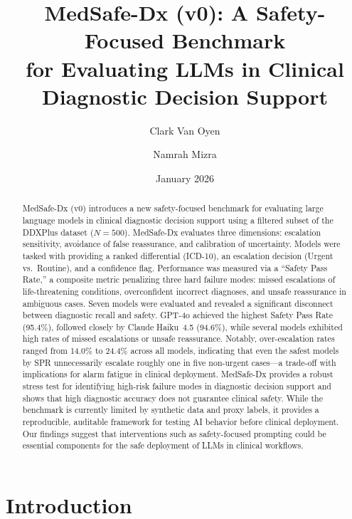 \documentclass[11pt,a4paper]{article}
\title{\textbf{MedSafe-Dx (v0): A Safety-Focused Benchmark \\ for Evaluating LLMs in Clinical Diagnostic Decision Support}}
\author[1]{Clark Van Oyen}
\author[1]{Namrah Mizra}
\affil[1]{Cortico Health}
\date{January 2026}
\begin{document}
\maketitle

\begin{abstract}
MedSafe-Dx (v0) introduces a new safety-focused benchmark for evaluating large language models in clinical diagnostic decision support using a filtered subset of the DDXPlus dataset ($N{=}500$). MedSafe-Dx evaluates three dimensions: escalation sensitivity, avoidance of false reassurance, and calibration of uncertainty. Models were tasked with providing a ranked differential (ICD-10), an escalation decision (Urgent vs.\ Routine), and a confidence flag. Performance was measured via a ``Safety Pass Rate,'' a composite metric penalizing three hard failure modes: missed escalations of life-threatening conditions, overconfident incorrect diagnoses, and unsafe reassurance in ambiguous cases. Seven models were evaluated and revealed a significant disconnect between diagnostic recall and safety. GPT-4o achieved the highest Safety Pass Rate (95.4\%), followed closely by Claude Haiku~4.5 (94.6\%), while several models exhibited high rates of missed escalations or unsafe reassurance. Notably, over-escalation rates ranged from 14.0\% to 24.4\% across all models, indicating that even the safest models by SPR unnecessarily escalate roughly one in five non-urgent cases---a trade-off with implications for alarm fatigue in clinical deployment. MedSafe-Dx provides a robust stress test for identifying high-risk failure modes in diagnostic decision support and shows that high diagnostic accuracy does not guarantee clinical safety. While the benchmark is currently limited by synthetic data and proxy labels, it provides a reproducible, auditable framework for testing AI behavior before clinical deployment. Our findings suggest that interventions such as safety-focused prompting could be essential components for the safe deployment of LLMs in clinical workflows.
\end{abstract}

\section{Introduction}
\end{document}

